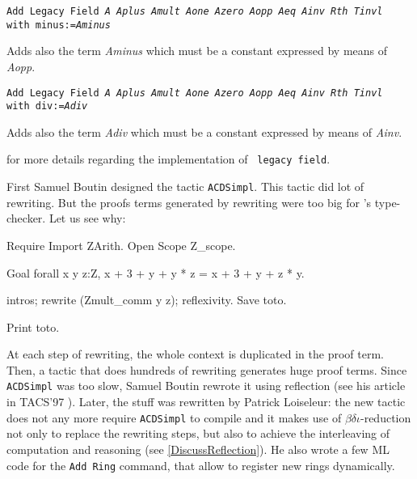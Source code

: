 \begin{Variants}

\item {\tt Add Legacy Field {\it A} {\it Aplus} {\it Amult} {\it Aone} {\it Azero}
{\it Aopp} {\it Aeq} {\it Ainv} {\it Rth} {\it Tinvl}}\\
{\tt \phantom{Add Field }with minus:={\it Aminus}}

Adds also the term {\it Aminus} which must be a constant expressed by
means of {\it Aopp}.

\item {\tt Add Legacy Field {\it A} {\it Aplus} {\it Amult} {\it Aone} {\it Azero}
{\it Aopp} {\it Aeq} {\it Ainv} {\it Rth} {\it Tinvl}}\\
{\tt \phantom{Add Legacy Field }with div:={\it Adiv}}

Adds also the term {\it Adiv} which must be a constant expressed by
means of {\it Ainv}.

\end{Variants}

\SeeAlso \cite{DelMay01} for more details regarding the implementation of {\tt
legacy field}.


First Samuel Boutin designed the tactic \texttt{ACDSimpl}. 
This tactic did lot of rewriting. But the proofs
terms generated by rewriting were too big for \Coq's type-checker.
Let us see why:

\begin{coq_eval}
Require Import ZArith.
Open Scope Z_scope.
\end{coq_eval}
\begin{coq_example}
Goal forall x y z:Z, x + 3 + y + y * z = x + 3 + y + z * y.
\end{coq_example}
\begin{coq_example*}
intros; rewrite (Zmult_comm y z); reflexivity.
Save toto.
\end{coq_example*}
\begin{coq_example}
Print  toto.
\end{coq_example}

At each step of rewriting, the whole context is duplicated in the proof
term. Then, a tactic that does hundreds of rewriting generates huge proof
terms. Since \texttt{ACDSimpl} was too slow, Samuel Boutin rewrote it
using reflection (see his article in TACS'97 \cite{Bou97}). Later, the
stuff was rewritten by Patrick
Loiseleur: the new tactic does not any more require \texttt{ACDSimpl}
to compile and it makes use of $\beta\delta\iota$-reduction 
not only to replace the rewriting steps, but also to achieve the
interleaving of computation and 
reasoning (see \ref{DiscussReflection}). He also wrote a
few ML code for the \texttt{Add Ring} command, that allow to register
new rings dynamically.

